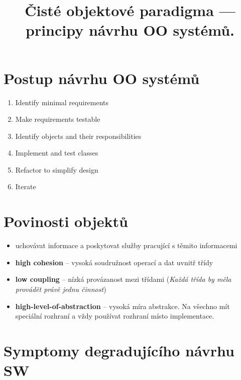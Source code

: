 \documentclass{szzclass}
\title{Čisté objektové paradigma — principy návrhu OO systémů.}
\begin{document}
\maketitle

\tableofcontents
\newpage

\section{Postup návrhu OO systémů}

\begin{enumerate}
      \item Identify minimal requirements
      \item Make requirements testable
      \item Identify objects and their responsibilities
      \item Implement and test classes
      \item Refactor to simplify design
      \item Iterate
\end{enumerate}

\section{Povinosti objektů}

\begin{itemize}
      \item uchovávat informace a poskytovat služby pracující s těmito informacemi
      \item \textbf{high cohesion} -- vysoká soudružnost operací a dat uvnitř třídy
      \item \textbf{low coupling} -- nízká provázanost mezi třídami
      (\textit{Každá třída by měla provádět právě jednu činnost})
      \item \textbf{high-level-of-abstraction} -- vysoká míra abstrakce.
      Na všechno mít speciální rozhraní a vždy používat rozhraní místo implementace.
\end{itemize}


\section{Symptomy degradujícího návrhu SW}
\end{document}

